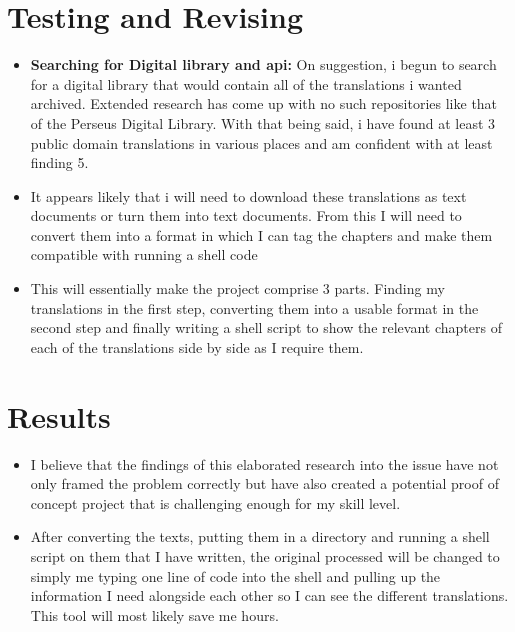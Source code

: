 \documentclass{article}
\begin{document}
\section{Testing and Revising}

\begin{itemize}
\item{\textbf{Searching for Digital library and api:} On suggestion, i begun to search for a digital library that would contain all of the translations i wanted archived. Extended research has come up with no such repositories like that of the Perseus Digital Library. With that being said, i have found at least 3 public domain translations in various places and am confident with at least finding 5.}

\item{It appears likely that i will need to download these translations as text documents or turn them into text documents. From this I will need to convert them into a format in which I can tag the chapters and make them compatible with running a shell code}

\item{This will essentially make the project comprise 3 parts. Finding my translations in the first step, converting them into a usable format in the second step and finally writing a shell script to show the relevant chapters of each of the translations side by side as I require them.}



\end{itemize}





\section{Results}


\begin{itemize}

\item{I believe that the findings of this elaborated research into the issue have not only framed the problem correctly but have also created a potential proof of concept project that is challenging enough for my skill level.}

\item{After converting the texts, putting them in a directory and running a shell script on them that I have written, the original processed will be changed to simply me typing one line of code into the shell and pulling up the information I need alongside each other so I can see the different translations. This tool will most likely save me hours.}



\end{itemize}
\end{document}
